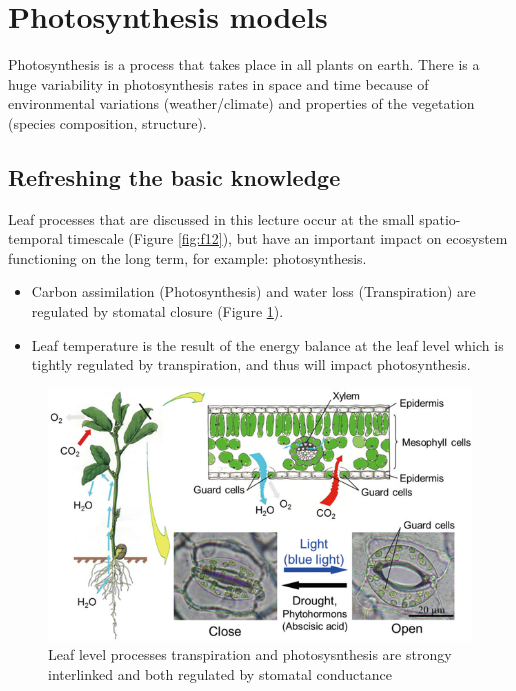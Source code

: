 \documentclass[12pt,oneside]{book}
\providecommand{\tightlist}{%
  \setlength{\itemsep}{0pt}\setlength{\parskip}{0pt}}
\begin{document}

\section{Photosynthesis models}\label{photosynthesis-models}

Photosynthesis is a process that takes place in all plants on earth.
There is a huge variability in photosynthesis rates in space and time
because of environmental variations (weather/climate) and properties of
the vegetation (species composition, structure).

\subsection{Refreshing the basic
knowledge}\label{refreshing-the-basic-knowledge}

Leaf processes that are discussed in this lecture occur at the small
spatio-temporal timescale (Figure \ref{fig:f12}), but have an important
impact on ecosystem functioning on the long term, for example:
photosynthesis.

\begin{itemize}
\tightlist
\item
  Carbon assimilation (Photosynthesis) and water loss (Transpiration)
  are regulated by stomatal closure (Figure \ref{fig:f21}).
\item
  Leaf temperature is the result of the energy balance at the leaf level
  which is tightly regulated by transpiration, and thus will impact
  photosynthesis.
\end{itemize}

\begin{figure}

{\centering \includegraphics[width=0.8\linewidth]{figures/chap2/leaf_level_processes} 

}

\caption{Leaf level processes transpiration and photosysnthesis are strongy interlinked and both regulated by stomatal conductance}\label{fig:f21}
\end{figure}
\end{document}
